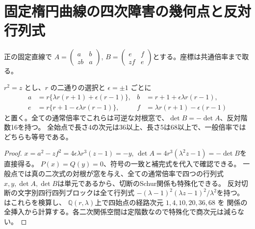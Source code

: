 \section{固定楕円曲線の四次障害の幾何点と反対行列式}
\label{sec:fixed-geometric-quartic-locus}
正の固定直線で $A=\left(\begin{smallmatrix}a&b\\zb&a\end{smallmatrix}\right)$,
$B=\left(\begin{smallmatrix}e&f\\zf&e\end{smallmatrix}\right)$とする。座標は共通倍率まで取る。
\begin{theorem}\label{thm:opposite-fixed-dets}
$r^2=z$ とし、$r$ の二通りの選択と $\epsilon=\pm1$ ごとに
\[
\begin{aligned}
 a&=r\{\lambda r(r+1)+\epsilon(r-1)\},&
 b&=r+1+\epsilon\lambda r(r-1),\\
 e&=r\{r+1-\epsilon\lambda r(r-1)\},&
 f&=\lambda r(r+1)-\epsilon(r-1)
\end{aligned}
\]
と置く。全ての通常倍率でこれらは可逆な対根窓で、$\det B=-\det A$、反対階数16を持つ。
全始点で長さ4の次元は36以上、長さ5は68以上で、一般倍率ではどちらも等号である。
\end{theorem}
\begin{proof}
$x=a^2-zf^2=4\epsilon\lambda r^3(z-1)=-y$,
$\det A=4r^3(\lambda^2z-1)=-\det B$を直接得る。
$P(x)=Q(y)=0$、符号の一致と補完式を代入で確認できる。
一般点では真の二次式の対根が窓を与え、全ての通常倍率で四つの行列式
$x,y,\det A,\det B$は単元であるから、切断のSchur関係も特殊化できる。
反対切断の文字別四行四列ブロックは全て行列式
$-(\lambda-1)^2(\lambda z-1)^2/\lambda^2$を持つ。
 はこれらを検算し、
$\mathbb Q(r,\lambda)$上で四始点の経路次元 $1,4,10,20,36,68$ を
関係の全挿入から計算する。各二次関係空間は定階数なので特殊化で商次元は減らない。
\end{proof}

